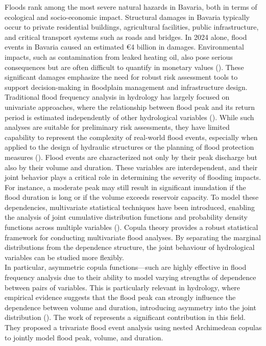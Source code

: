 \documentclass[
]{krantz}
\begin{document}
Floods rank among the most severe natural hazards in Bavaria, both in terms of ecological and socio-economic impact.
Structural damages in Bavaria typically occur to private residential buildings, agricultural facilities,
public infrastructure, and critical transport systems such as roads and bridges. In 2024 alone, flood events
in Bavaria caused an estimated €4 billion in damages. Environmental impacts, such as contamination
from leaked heating oil, also pose serious consequences but are often difficult to quantify in
monetary values (\citet{lfu2025}).
These significant damages emphasize the need for robust risk assessment tools
to support decision-making in floodplain management and infrastructure design.
Traditional flood frequency analysis in hydrology has largely focused on univariate approaches,
where the relationship between flood peak and its return period is estimated independently of other
hydrological variables (\citet{khajehali2025}).
While such analyses are suitable for preliminary risk assessments,
they have limited capability to represent the complexity of real-world flood events,
especially when applied to the design of hydraulic structures or the
planning of flood protection measures (\citet{grimaldi2006}).
Flood events are characterized not only by their peak discharge but also by their volume and duration.
These variables are interdependent, and their joint behavior plays a critical role in determining the severity of flooding impacts.
For instance, a moderate peak may still result in significant inundation if the flood duration is long or
if the volume exceeds reservoir capacity.
To model these dependencies, multivariate statistical techniques have been introduced,
enabling the analysis of joint cumulative distribution functions and probability density functions across multiple variables (\citet{grimaldi2006}).
Copula theory provides a robust statistical framework for conducting multivariate flood analyses.
By separating the marginal distributions from the dependence structure, the joint behaviour of hydrological variables can be studied more flexibly.\\
In particular, asymmetric copula functions---such are highly effective in flood frequency analysis due to their ability to model varying strengths of dependence between pairs of variables.
This is particularly relevant in hydrology, where empirical evidence suggests that the flood peak can strongly influence the dependence between volume and duration, introducing asymmetry into the joint distribution (\citet{grimaldi2006}).
The work of \citet{grimaldi2006} represents a significant contribution in this field. They proposed a trivariate flood event analysis using nested Archimedean copulas to jointly model flood peak, volume, and duration.
\end{document}
